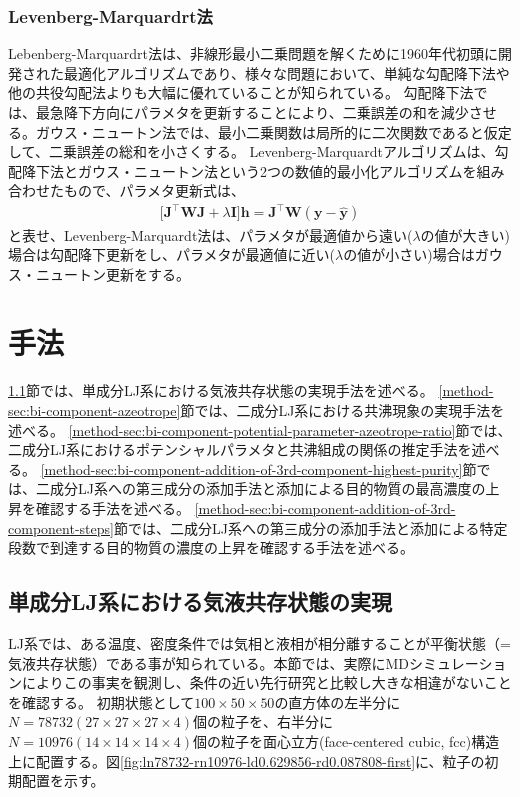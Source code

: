 \documentclass[titlepage]{jsreport}
\begin{document}
\subsection{Levenberg-Marquardrt法}\label{principle-subsec:levenberg-marquardt}
Lebenberg-Marquardrt法は、非線形最小二乗問題を解くために1960年代初頭に開発された最適化アルゴリズムであり、様々な問題において、単純な勾配降下法や他の共役勾配法よりも大幅に優れていることが知られている\cite{levenberg-marquardt}。
勾配降下法では、最急降下方向にパラメタを更新することにより、二乗誤差の和を減少させる。ガウス・ニュートン法では、最小二乗関数は局所的に二次関数であると仮定して、二乗誤差の総和を小さくする。
Levenberg-Marquardtアルゴリズムは、勾配降下法とガウス・ニュートン法という2つの数値的最小化アルゴリズムを組み合わせたもので、パラメタ更新式は、
\large
\begin{eqnarray}
\Big[\bm{J}^\top\bm{W}\bm{J}+\lambda\bm{I}\Big]\bm{h} = \bm{J}^\top\bm{W}(\bm{y}-\bm{\hat{y}})
\end{eqnarray}
\normalsize
と表せ、Levenberg-Marquardt法は、パラメタが最適値から遠い($\lambda$の値が大きい)場合は勾配降下更新をし、パラメタが最適値に近い($\lambda$の値が小さい)場合はガウス・ニュートン更新をする\cite{gradient-descent_gauss-newton_levenberg-marquardt}。


\chapter{手法} \label{chap:method}
\ref{method-sec:mono-component}節では、単成分LJ系における気液共存状態の実現手法を述べる。
\ref{method-sec:bi-component-azeotrope}節では、二成分LJ系における共沸現象の実現手法を述べる。
\ref{method-sec:bi-component-potential-parameter-azeotrope-ratio}節では、二成分LJ系におけるポテンシャルパラメタと共沸組成の関係の推定手法を述べる。
\ref{method-sec:bi-component-addition-of-3rd-component-highest-purity}節では、二成分LJ系への第三成分の添加手法と添加による目的物質の最高濃度の上昇を確認する手法を述べる。
\ref{method-sec:bi-component-addition-of-3rd-component-steps}節では、二成分LJ系への第三成分の添加手法と添加による特定段数で到達する目的物質の濃度の上昇を確認する手法を述べる。


\section{単成分LJ系における気液共存状態の実現} \label{method-sec:mono-component}
LJ系では、ある温度、密度条件では気相と液相が相分離することが平衡状態（=気液共存状態）である事が知られている\cite{gas-liquid-equilibrium}。本節では、実際にMDシミュレーションによりこの事実を観測し、条件の近い先行研究と比較し大きな相違がないことを確認する。
初期状態として$100×50×50$の直方体の左半分に$N=78732(27×27×27×4)$個の粒子を、右半分に$N=10976(14×14×14×4)$個の粒子を面心立方(face-centered cubic, fcc)構造上に配置する。図\ref{fig:ln78732-rn10976-ld0.629856-rd0.087808-first}に、粒子の初期配置を示す。
\end{document}
